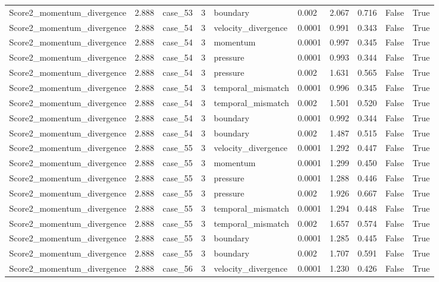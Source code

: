 \begin{longtable}{llllllllll}
Score2\_momentum\_divergence & 2.888 & case\_53 & 3 & boundary & 0.002 & 2.067 & 0.716 & False & True \\
Score2\_momentum\_divergence & 2.888 & case\_54 & 3 & velocity\_divergence & 0.0001 & 0.991 & 0.343 & False & True \\
Score2\_momentum\_divergence & 2.888 & case\_54 & 3 & momentum & 0.0001 & 0.997 & 0.345 & False & True \\
Score2\_momentum\_divergence & 2.888 & case\_54 & 3 & pressure & 0.0001 & 0.993 & 0.344 & False & True \\
Score2\_momentum\_divergence & 2.888 & case\_54 & 3 & pressure & 0.002 & 1.631 & 0.565 & False & True \\
Score2\_momentum\_divergence & 2.888 & case\_54 & 3 & temporal\_mismatch & 0.0001 & 0.996 & 0.345 & False & True \\
Score2\_momentum\_divergence & 2.888 & case\_54 & 3 & temporal\_mismatch & 0.002 & 1.501 & 0.520 & False & True \\
Score2\_momentum\_divergence & 2.888 & case\_54 & 3 & boundary & 0.0001 & 0.992 & 0.344 & False & True \\
Score2\_momentum\_divergence & 2.888 & case\_54 & 3 & boundary & 0.002 & 1.487 & 0.515 & False & True \\
Score2\_momentum\_divergence & 2.888 & case\_55 & 3 & velocity\_divergence & 0.0001 & 1.292 & 0.447 & False & True \\
Score2\_momentum\_divergence & 2.888 & case\_55 & 3 & momentum & 0.0001 & 1.299 & 0.450 & False & True \\
Score2\_momentum\_divergence & 2.888 & case\_55 & 3 & pressure & 0.0001 & 1.288 & 0.446 & False & True \\
Score2\_momentum\_divergence & 2.888 & case\_55 & 3 & pressure & 0.002 & 1.926 & 0.667 & False & True \\
Score2\_momentum\_divergence & 2.888 & case\_55 & 3 & temporal\_mismatch & 0.0001 & 1.294 & 0.448 & False & True \\
Score2\_momentum\_divergence & 2.888 & case\_55 & 3 & temporal\_mismatch & 0.002 & 1.657 & 0.574 & False & True \\
Score2\_momentum\_divergence & 2.888 & case\_55 & 3 & boundary & 0.0001 & 1.285 & 0.445 & False & True \\
Score2\_momentum\_divergence & 2.888 & case\_55 & 3 & boundary & 0.002 & 1.707 & 0.591 & False & True \\
Score2\_momentum\_divergence & 2.888 & case\_56 & 3 & velocity\_divergence & 0.0001 & 1.230 & 0.426 & False & True \\

\end{longtable}
